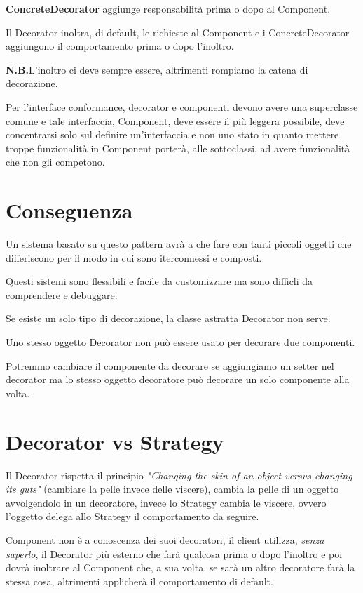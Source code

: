 \textbf{ConcreteDecorator} aggiunge responsabilità prima o dopo al Component.
\medskip

Il Decorator inoltra, di default, le richieste al Component e i ConcreteDecorator aggiungono il comportamento prima o dopo l'inoltro.

\medskip
\textbf{N.B.}L'inoltro ci deve sempre essere, altrimenti rompiamo la catena di decorazione.
\medskip

Per l’interface conformance, decorator e componenti devono avere una superclasse comune e tale interfaccia, Component, deve essere il più leggera possibile, deve 
concentrarsi solo sul definire un'interfaccia e non uno stato in quanto mettere troppe funzionalità in Component porterà, alle sottoclassi, ad avere funzionalità che 
non gli competono.

\section{Conseguenza}

Un sistema basato su questo pattern avrà a che fare con tanti piccoli oggetti che differiscono per il modo in cui sono iterconnessi e composti.

Questi sistemi sono flessibili e facile da customizzare ma sono difficli da comprendere e debuggare.

Se esiste un solo tipo di decorazione, la classe astratta Decorator non serve.

Uno stesso oggetto Decorator non può essere usato per decorare due componenti.

Potremmo cambiare il componente da decorare se aggiungiamo un setter nel decorator ma lo stesso oggetto decoratore può decorare un solo componente alla volta.

\section{Decorator vs Strategy}

Il Decorator rispetta il principio \textit{"Changing the skin of an object versus changing its guts"} (cambiare la pelle invece delle viscere), cambia la pelle di un 
oggetto avvolgendolo in un decoratore, invece lo Strategy cambia le viscere, ovvero l'oggetto delega allo Strategy il comportamento da seguire.

Component non è a conoscenza dei suoi decoratori, il client utilizza, \textit{senza saperlo}, il Decorator più esterno che farà qualcosa prima o dopo l'inoltro e poi 
dovrà inoltrare al Component che, a sua volta, se sarà un altro decoratore farà la stessa cosa, altrimenti applicherà il comportamento di default.

